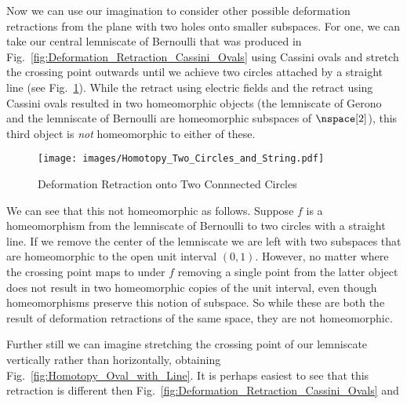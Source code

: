 \documentclass{book}                                                           %
\begin{document}
                Now we can use our imagination to consider other possible
                deformation retractions from the plane with two holes onto
                smaller subspaces. For one, we can take our central lemniscate
                of Bernoulli that was produced in
                Fig.~\ref{fig:Deformation_Retraction_Cassini_Ovals} using
                Cassini ovals and stretch the crossing point outwards until we
                achieve two circles attached by a straight line
                (see Fig.~\ref{fig:Homotopy_Two_Circles_and_String}). While the
                retract using electric fields and the retract using Cassini
                ovals resulted in two homeomorphic objects (the lemniscate of
                Gerono and the lemniscate of Bernoulli are homeomorphic
                subspaces of $\nspace[2]$), this third object is \textit{not}
                homeomorphic to either of these.
                \begin{figure}[H]
                    \centering
                    \captionsetup{type=figure}
                    \texttt{[image: images/Homotopy\_Two\_Circles\_and\_String.pdf]}
                    \caption{Deformation Retraction onto Two Connnected Circles}
                    \label{fig:Homotopy_Two_Circles_and_String}
                \end{figure}
                We can see that this not homeomorphic as follows. Suppose $f$ is
                a homeomorphism from the lemniscate of Bernoulli to two circles
                with a straight line. If we remove the center of the lemniscate
                we are left with two subspaces that are homeomorphic to the open
                unit interval $(0,1)$. However, no matter where the crossing
                point maps to under $f$ removing a single point from the latter
                object does not result in two homeomorphic copies of the unit
                interval, even though homeomorphisms preserve this notion of
                subspace. So while these are both the result of deformation
                retractions of the same space, they are not homeomorphic.
                \par\hfill\par
                Further still we can imagine stretching the
                crossing point of our lemniscate vertically rather than
                horizontally, obtaining Fig.~\ref{fig:Homotopy_Oval_with_Line}.
                It is perhaps easiest to see that this retraction is different
                then Fig.~\ref{fig:Deformation_Retraction_Cassini_Ovals} and
\end{document}
